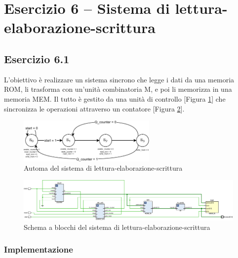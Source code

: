 \section{Esercizio 6 -- Sistema di lettura-elaborazione-scrittura}
\subsection{Esercizio 6.1}

L'obiettivo è realizzare un sistema sincrono che legge i dati da una memoria ROM, li trasforma con un'unità combinatoria M, e poi li memorizza in una memoria MEM. Il tutto è gestito da una unità di controllo [Figura \ref{fig:rom_m_mem}] che sincronizza le operazioni attraverso un contatore [Figura \ref{fig:6_1_ROM_M_MEM}].

\begin{figure}[h]
    \centering
    \includegraphics[width=0.6\textwidth]{img/rom_m_mem.pdf}
    \caption{Automa del sistema di lettura-elaborazione-scrittura}
    \label{fig:rom_m_mem}
\end{figure}

\begin{figure}[h]
    \centering
    \includegraphics[width=\textwidth]{img/6_1_ROM_M_MEM.pdf}
    \caption{Schema a blocchi del sistema di lettura-elaborazione-scrittura}
    \label{fig:6_1_ROM_M_MEM}
\end{figure}

\subsubsection{Implementazione}

\begin{code}
    \inputminted{vhdl}{vhdl/rom_m_mem.vhd}
    \caption{Implementazione del sistema di lettura-elaborazione-scrittura}
    \label{cod:rom_m_mem}
\end{code}

